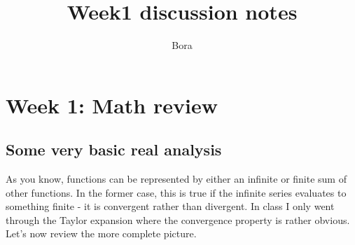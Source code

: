 \documentclass[11pt]{article}
\title{Week1 discussion notes}
\author{Bora}
\begin{document}
    
    \maketitle
    
    

    
    \hypertarget{week-1-math-review}{%
\section{Week 1: Math review}\label{week-1-math-review}}

\hypertarget{some-very-basic-real-analysis}{%
\subsection{Some very basic real
analysis}\label{some-very-basic-real-analysis}}

As you know, functions can be represented by either an infinite or
finite sum of other functions. In the former case, this is true if the
infinite series evaluates to something finite - it is convergent rather
than divergent. In class I only went through the Taylor expansion where
the convergence property is rather obvious. Let's now review the more
complete picture.
\end{document}
